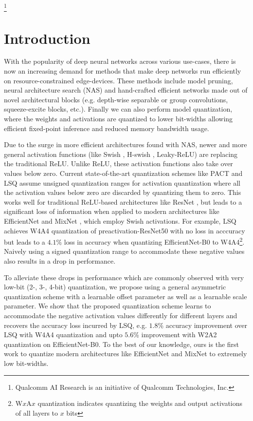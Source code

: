\documentclass[10pt,twocolumn,letterpaper]{article}
\newcommand\blfootnote[1]{\begingroup
  \renewcommand\thefootnote{}\footnote{#1}\addtocounter{footnote}{-1}\endgroup
}
\begin{document}
\blfootnote{Qualcomm AI Research is an initiative of Qualcomm Technologies, Inc.}


\section{Introduction}
With the popularity of deep neural networks across various use-cases, there is now an increasing demand for methods that make deep networks run efficiently on resource-constrained edge-devices. These methods include model pruning, neural architecture search (NAS) and hand-crafted efficient networks made out of novel architectural blocks (e.g. depth-wise separable or group convolutions, squeeze-excite blocks, etc.). Finally we can also perform model quantization, where the weights and activations are quantized to lower bit-widths allowing efficient fixed-point inference and reduced memory bandwidth usage. 

Due to the surge in more efficient architectures found with NAS, newer and more general activation functions (like Swish \cite{swish}, H-swish \cite{mobilenetv3}, Leaky-ReLU) are replacing the traditional ReLU. Unlike ReLU, these activation functions also take over values below zero. Current state-of-the-art quantization schemes like PACT \cite{pact2018} and LSQ \cite{lsq} assume unsigned quantization ranges for activation quantization where all the activation values below zero are discarded by quantizing them to zero. This works well for traditional ReLU-based architectures like ResNet \cite{resnet2}, but leads to a significant loss of information when applied to modern architectures like EfficientNet \cite{efficientnet} and MixNet \cite{mixnet}, which employ Swish activations. For example, LSQ achieves W4A4 quantization of preactivation-ResNet50 with no loss in acccuracy but leads to a $4.1$\% loss in accuracy when quantizing EfficientNet-B0 to W4A4\footnote{W$x$A$x$ quantization indicates quantizing the weights and output activations of all layers to $x$ bits}. Naively using a signed quantization range to accommodate these negative values also results in a drop in performance. 

To alleviate these drops in performance which are commonly observed with very low-bit (2-, 3-, 4-bit) quantization, we propose using a general asymmetric quantization scheme with a learnable offset parameter as well as a learnable scale parameter. We show that the proposed quantization scheme learns to accommodate the negative activation values differently for different layers and recovers the accuracy loss incurred by LSQ, e.g. $1.8$\% accuracy improvement over LSQ with W4A4 quantization and upto $5.6$\% improvement with W2A2 quantization on EfficientNet-B0. To the best of our knowledge, ours is the first work to quantize modern architectures like EfficientNet and MixNet to extremely low bit-widths.
\end{document}
